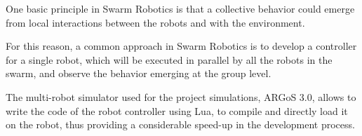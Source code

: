 \documentclass{article}
\newcommand{\maxmin}{$\mathcal{MAX}-\mathcal{MIN}$}
\begin{document}
One basic principle in Swarm Robotics is that a collective behavior could emerge from local interactions between the robots and with the environment.

For this reason, a common approach in Swarm Robotics is to develop a controller for a single robot, which will be executed in parallel by all the robots in the swarm, and observe the behavior emerging at the group level.

The multi-robot simulator used for the project simulations, ARGoS 3.0, allows to write the code of the robot controller
using Lua, to compile and directly load it on the robot, thus providing a considerable speed-up in the development process.
 






\end{document}
